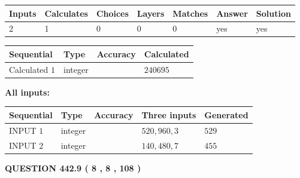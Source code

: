 \documentclass{ctexart}
\begin{document}
 
\noindent{}
 
 

 
   
   
   
   
\noindent\begin{tabular}{|l|l|l|l|l|l|l|}
 \hline
Inputs & Calculates & Choices & Layers & Matches & Answer & Solution \\ \hline
 2  & 
 1  & 
 0
  & 
 0  & 
 0  & 
  yes & 
  yes 
  \\ \hline
 \end{tabular}
   
   
   
   
\noindent{}
   
   
  
  
\noindent\begin{tabular}{|l|l|l|l|}
\hline
 Sequential & Type & Accuracy & Calculated \\ 
\hline
 
 
  Calculated $  1 $ & integer &  & 
  $ 240695 $ 
 \\  \hline  
 \end{tabular}
   
   
   
   
\noindent\vspace{0.1in}\hspace{-0.08in} {\textbf{\Large{All inputs: }}}
   
   
  
  
\noindent\begin{tabular}{|l|l|l|l|l|}
\hline
 Sequential & Type & Accuracy & Three inputs & Generated \\ 
\hline
 
 
  INPUT $  1 $ & integer &  & $
 520
 , 
 960
 , 
 3
 $ & $ 529 $ 
 \\  \hline  
 
 
  INPUT $  2 $ & integer &  & $
 140
 , 
 480
 , 
 7
 $ & $ 455 $ 
 \\  \hline  
 \end{tabular}
   
   
  
\vspace{0.2in}
  
{\textbf{\Large{QUESTION
442.9 
 ( 8 , 8 , 108 )
}}}
  
  
 
\end{document}
